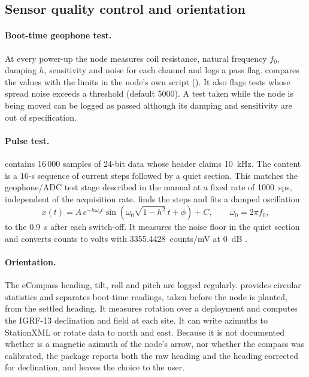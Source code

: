 \documentclass[report]{seismica}
\begin{document}
\subsection{Sensor quality control and orientation}

\paragraph{Boot-time geophone test.} At every power-up the node measures coil resistance, natural frequency $f_0$, damping $h$, sensitivity and noise for each channel and logs a pass flag.  compares the values with the limits in the node's own script (). It also flags tests whose spread noise exceeds a threshold (default 5000). A test taken while the node is being moved can be logged as passed although its damping and sensitivity are out of specification.

\paragraph{Pulse test.}  contains 16\,000 samples of 24-bit data whose header claims 10~kHz. The content is a 16-s sequence of current steps followed by a quiet section. This matches the geophone/ADC test stage described in the manual \citep{dtcc_manual} at a fixed rate of 1000~sps, independent of the acquisition rate.  finds the steps and fits a damped oscillation
\begin{equation}\label{eq:pulse}
x(t) = A\, e^{-h\omega_0 t} \sin\!\left(\omega_0\sqrt{1-h^2}\,t + \phi\right) + C,\qquad \omega_0 = 2\pi f_0,
\end{equation}
to the 0.9~s after each switch-off. It measures the noise floor in the quiet section and converts counts to volts with 3355.4428~counts/mV at 0~dB \citep{dtcc_manual}.

\paragraph{Orientation.} The eCompass heading, tilt, roll and pitch are logged regularly.  provides circular statistics and separates boot-time readings, taken before the node is planted, from the settled heading. It measures rotation over a deployment and computes the IGRF-13 \citep{alken_igrf13_2021} declination and field at each site. It can write azimuths to StationXML or rotate data to north and east. Because it is not documented whether  is a magnetic azimuth of the node's arrow, nor whether the compass was calibrated, the package reports both the raw heading and the heading corrected for declination, and leaves the choice to the user.
\end{document}
